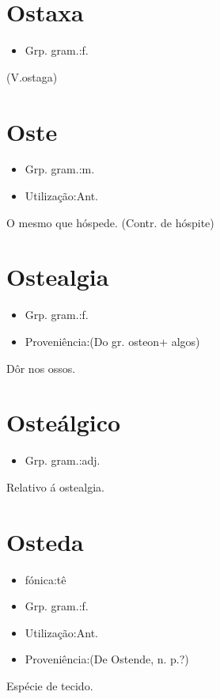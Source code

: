 \section{Ostaxa}
\begin{itemize}
\item {Grp. gram.:f.}
\end{itemize}
(V.ostaga)
\section{Oste}
\begin{itemize}
\item {Grp. gram.:m.}
\end{itemize}
\begin{itemize}
\item {Utilização:Ant.}
\end{itemize}
O mesmo que \textunderscore hóspede\textunderscore .
(Contr. de \textunderscore hóspite\textunderscore )
\section{Ostealgia}
\begin{itemize}
\item {Grp. gram.:f.}
\end{itemize}
\begin{itemize}
\item {Proveniência:(Do gr. \textunderscore osteon\textunderscore  + \textunderscore algos\textunderscore )}
\end{itemize}
Dôr nos ossos.
\section{Osteálgico}
\begin{itemize}
\item {Grp. gram.:adj.}
\end{itemize}
Relativo á ostealgia.
\section{Osteda}
\begin{itemize}
\item {fónica:tê}
\end{itemize}
\begin{itemize}
\item {Grp. gram.:f.}
\end{itemize}
\begin{itemize}
\item {Utilização:Ant.}
\end{itemize}
\begin{itemize}
\item {Proveniência:(De \textunderscore Ostende\textunderscore , n. p.?)}
\end{itemize}
Espécie de tecido.
